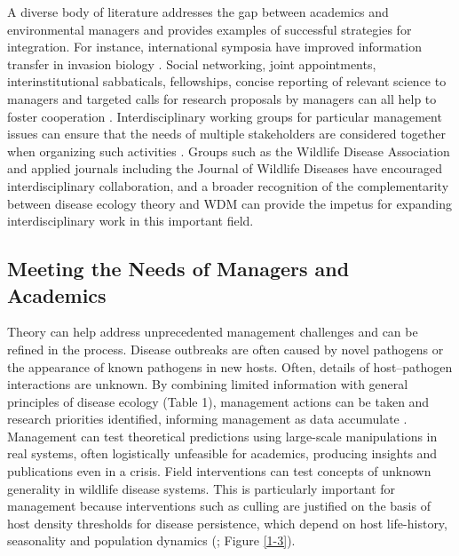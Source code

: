 A diverse body of literature addresses the gap between academics and environmental managers and provides examples of successful strategies for integration.
For instance, international symposia have improved information transfer in invasion biology \citep{Shaw2010a}.
Social networking, joint appointments, interinstitutional sabbaticals, fellowships, concise reporting of relevant science to managers and targeted calls for research proposals by managers can all help to foster cooperation \citep{Gibbons2008}.
Interdisciplinary working groups for particular management issues can ensure that the needs of multiple stakeholders are considered together when organizing such activities \citep{Gibbons2008}.
Groups such as the Wildlife Disease Association and applied journals including the Journal of Wildlife Diseases have encouraged interdisciplinary collaboration, and a broader recognition of the complementarity between disease ecology theory and WDM can provide the impetus for expanding interdisciplinary work in this important field.

\subsection{Meeting the Needs of Managers and Academics}

Theory can help address unprecedented management challenges and can be refined in the process.
Disease outbreaks are often caused by novel pathogens or the appearance of known pathogens in new hosts. Often, details of host–pathogen interactions are unknown.
By combining limited information with general principles of disease ecology (Table 1), management actions can be taken and research priorities identified, informing management as data accumulate \citep{McDonald-Madden2010a}.
Management can test theoretical predictions using large-scale manipulations in real systems, often logistically unfeasible for academics, producing insights and publications even in a crisis.
Field interventions can test concepts of unknown generality in wildlife disease systems.
This is particularly important for management because interventions such as culling are justified on the basis of host density thresholds for disease persistence, which depend on host life-history, seasonality and population dynamics (\cite{Lloyd-Smith2005, altizer2006seasonality}; Figure \ref{1-3}).

